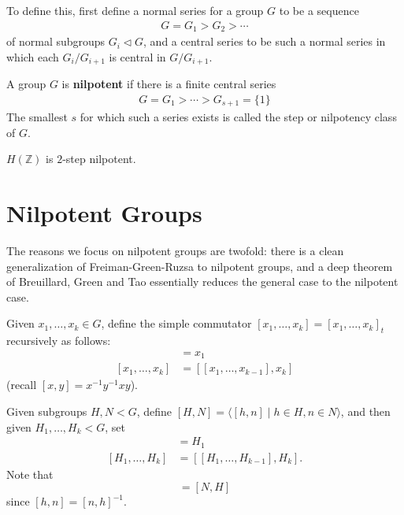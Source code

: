 \documentclass{article}
\newcommand{\named}[1]{\textbf{#1}\index{#1}}
\numberwithin{equation}{section}
\begin{document}
To define this, first define a normal series for a group $G$ to be a sequence
\begin{align*}
  G = G_1 > G_2 > \dotsb
\end{align*}
of normal subgroups $G_i \lhd G$, and a central series to be such a normal series in which each $G_i / G_{i+1}$ is central in $G/G_{i+1}$.
\begin{defi}
  A group $G$ is \named{nilpotent} if there is a finite central series
  \begin{align*}
    G = G_1 > \dotsb > G_{s+1} = \{1\}
  \end{align*}
  The smallest $s$ for which such a series exists is called the step or nilpotency class of $G$.
\end{defi}
\begin{ex}
  $H(\mathbb{Z})$ is $2$-step nilpotent.
\end{ex}

\clearpage
\section{Nilpotent Groups}
\newlec
The reasons we focus on nilpotent groups are twofold: there is a clean generalization of Freiman-Green-Ruzsa to nilpotent groups, and a deep theorem of Breuillard, Green and Tao essentially reduces the general case to the nilpotent case.

Given $x_1, \dotsc, x_k \in G$, define the simple commutator
$[x_1, \dotsc, x_k] = [x_1, \dotsc, x_k]_t$ recursively as follows:
\begin{align*}
  [x_1] &= x_1 \\
  [x_1, \dotsc, x_k] &= [[x_1, \dotsc, x_{k-1}], x_k]
\end{align*}
(recall $[x,y] = x^{-1} y^{-1} x y$).

Given subgroups $H,N < G$, define $[H,N] = \langle [h,n] \mid h \in H, n \in N \rangle$, and then given $H_1, \dotsc, H_k < G$, set
\begin{align*}
  [H_1] &= H_1 \\
  [H_1, \dotsc, H_k] &= [[H_1, \dotsc, H_{k-1}], H_k].
\end{align*}
Note that
\begin{equation}
  [H,N] = [N,H] \label{eq:8.1}
\end{equation}
since $[h,n] = [n,h]^{-1}$.
\end{document}
